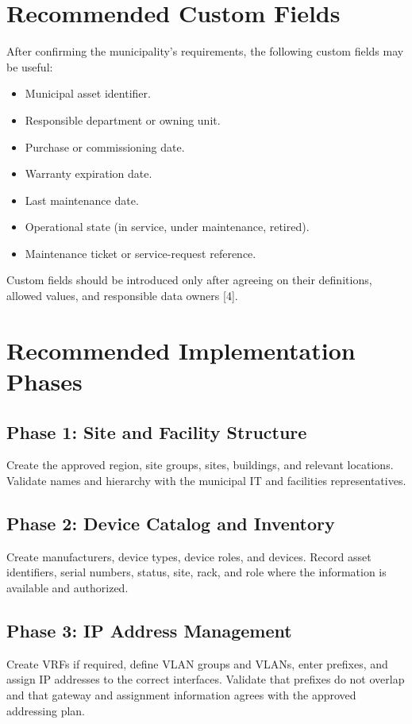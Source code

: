 \documentclass[11pt,a4paper,oneside]{report}
\begin{document}
\section{Recommended Custom Fields}
After confirming the municipality's requirements, the following custom fields may be useful:
\begin{itemize}
  \item Municipal asset identifier.
  \item Responsible department or owning unit.
  \item Purchase or commissioning date.
  \item Warranty expiration date.
  \item Last maintenance date.
  \item Operational state (in service, under maintenance, retired).
  \item Maintenance ticket or service-request reference.
\end{itemize}
Custom fields should be introduced only after agreeing on their definitions, allowed values, and responsible data owners [4].

\section{Recommended Implementation Phases}
\subsection{Phase 1: Site and Facility Structure}
Create the approved region, site groups, sites, buildings, and relevant locations. Validate names and hierarchy with the municipal IT and facilities representatives.

\subsection{Phase 2: Device Catalog and Inventory}
Create manufacturers, device types, device roles, and devices. Record asset identifiers, serial numbers, status, site, rack, and role where the information is available and authorized.

\subsection{Phase 3: IP Address Management}
Create VRFs if required, define VLAN groups and VLANs, enter prefixes, and assign IP addresses to the correct interfaces. Validate that prefixes do not overlap and that gateway and assignment information agrees with the approved addressing plan.
\end{document}
